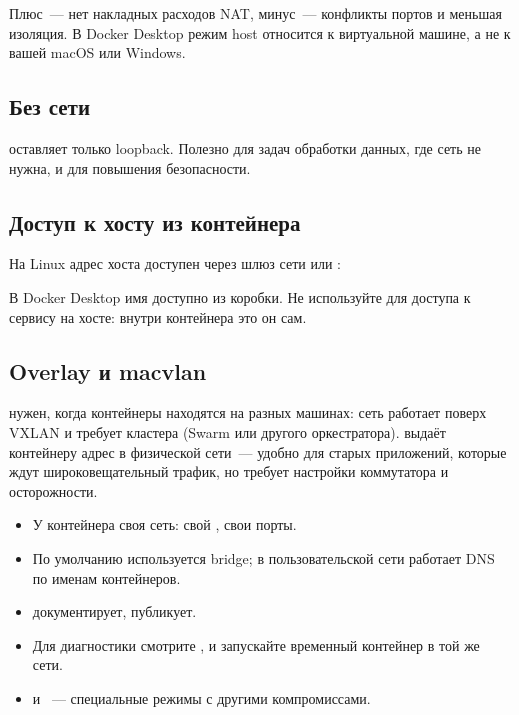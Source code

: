 Плюс~--- нет накладных расходов NAT, минус~--- конфликты портов
и меньшая изоляция. В Docker Desktop режим host относится к виртуальной
машине, а не к вашей macOS или Windows.

\subsection{Без сети}

 оставляет только loopback. Полезно для задач
обработки данных, где сеть не нужна, и для повышения безопасности.

\subsection{Доступ к хосту из контейнера}

На Linux адрес хоста доступен через шлюз сети или
:


В Docker Desktop имя  доступно из коробки.
Не используйте \cmd{localhost} для доступа к сервису на хосте:
внутри контейнера это он сам.

\subsection{Overlay и macvlan}

 нужен, когда контейнеры находятся на разных машинах:
сеть работает поверх VXLAN и требует кластера (Swarm или другого
оркестратора). \cmd{macvlan} выдаёт контейнеру адрес в физической
сети~--- удобно для старых приложений, которые ждут широковещательный
трафик, но требует настройки коммутатора и осторожности.

\begin{summarybox}
\begin{itemize}
  \item У контейнера своя сеть: свой , свои порты.
  \item По умолчанию используется bridge; в пользовательской сети
        работает DNS по именам контейнеров.
  \item {} документирует,  публикует.
  \item Для диагностики смотрите ,
         и запускайте временный контейнер
        в той же сети.
  \item {} и ~--- специальные режимы с другими
        компромиссами.
\end{itemize}
\end{summarybox}

